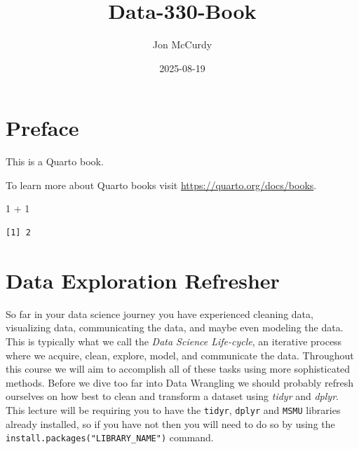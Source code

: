\documentclass[
  letterpaper,
  DIV=11,
  numbers=noendperiod]{scrreprt}
\title{Data-330-Book}
\author{Jon McCurdy}
\date{2025-08-19}
\newenvironment{Shaded}{\begin{snugshade}}{\end{snugshade}}
\newcommand{\DecValTok}[1]{\textcolor[rgb]{0.68,0.00,0.00}{#1}}
\newcommand{\SpecialCharTok}[1]{\textcolor[rgb]{0.37,0.37,0.37}{#1}}
\renewcommand*\contentsname{Table of contents}
\newcommand\contentsname{Table of contents}
\begin{document}
\maketitle

\renewcommand*\contentsname{Table of contents}
{
\hypersetup{linkcolor=}
\setcounter{tocdepth}{2}
\tableofcontents
}


\chapter*{Preface}\label{preface}


This is a Quarto book.

To learn more about Quarto books visit
\url{https://quarto.org/docs/books}.

\begin{Shaded}
\begin{Highlighting}[]
\DecValTok{1} \SpecialCharTok{+} \DecValTok{1}
\end{Highlighting}
\end{Shaded}

\begin{verbatim}
[1] 2
\end{verbatim}


\chapter{Data Exploration Refresher}\label{data-exploration-refresher}

So far in your data science journey you have experienced cleaning data,
visualizing data, communicating the data, and maybe even modeling the
data. This is typically what we call the
\textit{Data Science Life-cycle}, an iterative process where we acquire,
clean, explore, model, and communicate the data. Throughout this course
we will aim to accomplish all of these tasks using more sophisticated
methods. Before we dive too far into Data Wrangling we should probably
refresh ourselves on how best to clean and transform a dataset using
\textit{tidyr} and \textit{dplyr}. This lecture will be requiring you to
have the \texttt{tidyr}, \texttt{dplyr} and \texttt{MSMU} libraries
already installed, so if you have not then you will need to do so by
using the \texttt{install.packages("LIBRARY\_NAME")} command.
\end{document}

